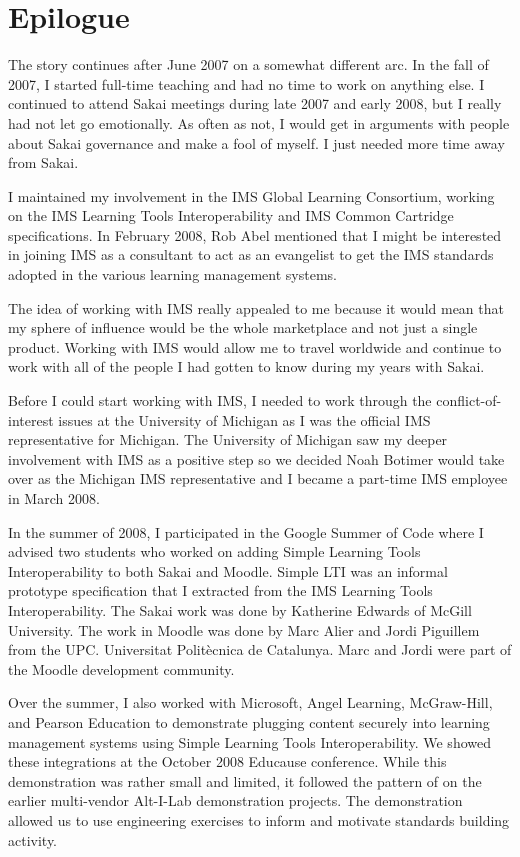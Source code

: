 \documentclass[12pt]{book}
\begin{document}

\chapter{Epilogue}

The story continues after June 2007 on a somewhat different arc.
In the fall of 2007, I started full-time teaching and had no time
to work on anything else.
I continued to attend Sakai meetings during late
2007 and early 2008, but I really had not let go emotionally.
As often as not, I would get in arguments with people about
Sakai governance and make a fool of myself.  I just needed more
time away from Sakai.

I maintained my involvement in the IMS Global Learning Consortium, working
on the IMS Learning Tools Interoperability and IMS Common Cartridge specifications.
In February 2008, Rob Abel mentioned that I might be interested in joining IMS
as a consultant to act as an evangelist to get the IMS standards adopted in the
various learning management systems.

The idea of working with IMS really appealed to me because it would mean that
my sphere of influence would be the whole marketplace and not just a single
product.  Working with IMS would allow me to travel worldwide and continue to
work with all of the people I had gotten to know during my years with Sakai.

Before I could start working with IMS, I needed to work through
the conflict-of-interest issues at the University of Michigan as
I was the official IMS representative
for Michigan.   The University of Michigan saw my deeper involvement with IMS
as a positive step so we decided Noah Botimer would take over as the Michigan IMS
representative and I became a part-time IMS employee in March 2008.

In the summer of 2008, I participated in the Google Summer of Code where
I advised two students who worked on adding Simple Learning Tools Interoperability
to both Sakai and Moodle.
Simple LTI was an informal
prototype specification that I extracted from the IMS Learning
Tools Interoperability.
The Sakai work was done by Katherine Edwards of McGill University.
The work in Moodle was done by
Marc Alier and Jordi Piguillem from the UPC. Universitat Polit\`ecnica de Catalunya.
Marc and Jordi were part of the Moodle development community.

\begin{sloppypar}
Over the summer, I also worked with Microsoft, Angel Learning, McGraw-Hill,
and Pearson Education to demonstrate plugging content securely into
learning management systems using Simple Learning Tools Interoperability.
We showed these integrations at the October 2008 Educause conference.
While this demonstration was rather small and limited, it followed
the pattern of
on the earlier multi-vendor Alt-I-Lab demonstration projects.
The demonstration allowed us to
use engineering exercises to inform and motivate standards building activity.
\end{sloppypar}
\end{document}
